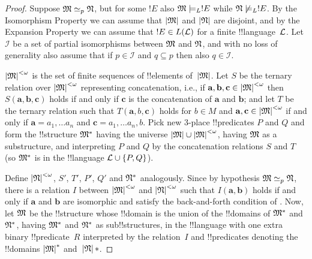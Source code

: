 \documentclass[../../../include/open-logic-section]{subfiles}
\begin{document}
\begin{proof}
Suppose $\Struct{M} \simeq_p \Struct{N}$, but for some $!E$ also
$\Struct{M} \models_L !E$ while $\Struct{N} \not\models_L !E$. By the
Isomorphism Property we can assume that $\Domain{M}$ and $\Domain{N}$
are disjoint, and by the Expansion Property we can assume that $!E \in
L(\Lang{L})$ for a finite !!{language}~$\Lang{L}$. Let $\mathcal{I}$
be a set of partial isomorphisms between $\Struct{M}$ and
$\Struct{N}$, and with no loss of generality also assume that if $p
\in \mathcal{I}$ and $q \subseteq p$ then also $q \in \mathcal{I}$.

$\Domain{M}^{<\omega}$ is the set of finite sequences of !!{element}s
of~$\Domain{M}$. Let $S$ be the ternary relation over $\Domain{M}^{<\omega}$
representing concatenation, i.e., if $\mathbf{a}, \mathbf{b},
\mathbf{c} \in \Domain{M}^{<\omega}$ then $S(\mathbf{a}, \mathbf{b},
\mathbf{c})$ holds if and only if $\mathbf{c}$ is the concatenation of
$\mathbf{a}$ and $\mathbf{b}$; and let $T$ be the ternary relation
such that $T(\mathbf{a}, b, \mathbf{c})$ holds for $b \in M$ and
$\mathbf{a}, \mathbf{c} \in \Domain{M}^{<\omega}$ if and only if $\mathbf{a} =
a_1, \dots a_n$ and $\mathbf{c} = a_1, \dots a_n, b$.  Pick new
3-place !!{predicate}s $P$ and $Q$ and form the !!{structure}
$\Struct{M}^*$ having the universe $\Domain{M} \cup \Domain{M}^{<\omega}$, having
$\Struct{M}$ as a substructure, and interpreting $P$ and $Q$ by the
concatenation relations $S$ and $T$ (so $\Struct{M}^*$ is in the
!!{language} $\Lang{L} \cup \{ P, Q\}$).

Define $\Domain{N}^{<\omega}$, $S'$, $T'$, $P'$, $Q'$ and
$\Struct{N}^*$ analogously. Since by hypothesis $\Struct{M} \simeq_p
\Struct{N}$, there is a relation $I$ between $\Domain{M}^{<\omega}$
and $\Domain{N}^{<\omega}$ such that $I(\mathbf{a}, \mathbf{b})$
holds if and only if $\mathbf{a}$ and $\mathbf{b}$ are isomorphic and
satisfy the back-and-forth condition of
.  Now, let $\Struct{M}$ be the
!!{structure} whose !!{domain} is the union of the !!{domain}s of
$\Struct{M}^*$ and $\Struct{N}^*$, having $\Struct{M}^*$ and
$\Struct{N}^*$ as sub!!{structure}s, in the !!{language} with one extra
binary !!{predicate}~$R$ interpreted by the relation~$I$ and
!!{predicate}s denoting the !!{domain}s $\Domain{M}^*$
and~$\Domain{N}*$.


\end{proof}
\end{document}

